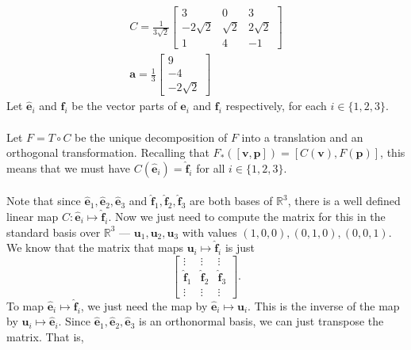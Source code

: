 \documentclass[12 pt, letterpaper]{hmcpset}
\begin{document}
\begin{solution}
	\[
		\boxed{
			\begin{gathered}
				C = \frac{1}{3 \sqrt 2} \begin{bmatrix}
				  3 & 0 & 3 \\
				  -2 \sqrt 2 & \sqrt 2 & 2 \sqrt 2 \\
				  1 & 4 & -1
			  \end{bmatrix} \\
				\mathbf{a} = \frac{1}{3} \begin{bmatrix}
				   	9 \\
					- 4 \\
					-2 \sqrt 2
				   \end{bmatrix}
			\end{gathered}
		}
	\]
	Let $\hat{\mathbf{e}}_{i}$ and $\hat{\mathbf{f}}_{i}$ be the vector parts of $\mathbf{e}_{i}$ and $\mathbf{f}_{i}$ respectively, for each $i \in \{ 1, 2, 3 \}$. \\\\
	Let $F = T \circ C$ be the unique decomposition of $F$ into a translation and an orthogonal transformation. Recalling that $F_{*}([\mathbf{v}, \mathbf{p}]) = [C(\mathbf{v}), F(\mathbf{p})]$, this means that we must have $C(\hat{\mathbf{e}}_{i}) = \hat{\mathbf{f}}_{i}$ for all $i \in \{ 1, 2, 3 \}$. \\\\
	Note that since $\hat{\mathbf{e}}_{1}, \hat{\mathbf{e}}_{2}, \hat{\mathbf{e}}_{3}$ and $\hat{\mathbf{f}}_{1}, \hat{\mathbf{f}}_{2}, \hat{\mathbf{f}}_{3}$ are both bases of $\mathbb{R}^{3}$, there is a well defined linear map $C : \hat{\mathbf{e}}_{i} \mapsto \hat{\mathbf{f}}_{i}$. Now we just need to compute the matrix for this in the standard basis over $\mathbb{R}^{3}$ --- $\mathbf{u}_{1}, \mathbf{u}_{2}, \mathbf{u}_{3}$ with values $(1, 0, 0), (0, 1, 0), (0, 0, 1)$.
	We know that the matrix that maps $\mathbf{u}_{i} \mapsto \hat{\mathbf{f}}_{i}$ is just
	\[
		\begin{bmatrix}
			\vdots & \vdots & \vdots \\
			\hat{\mathbf{f}}_{1} & \hat{\mathbf{f}}_{2} & \hat{\mathbf{f}}_{3} \\
			\vdots & \vdots & \vdots
		\end{bmatrix}.
	\]
	To map $\hat{\mathbf{e}}_{i} \mapsto \hat{\mathbf{f}}_{i}$, we just need the map by $\hat{\mathbf{e}}_{i} \mapsto \mathbf{u}_{i}$. This is the inverse of the map by $\mathbf{u}_{i} \mapsto \hat{\mathbf{e}}_{i}$. Since $\hat{\mathbf{e}}_{1}, \hat{\mathbf{e}}_{2}, \hat{\mathbf{e}}_{3}$ is an orthonormal basis, we can just transpose the matrix. That is,

\end{solution}
\end{document}
